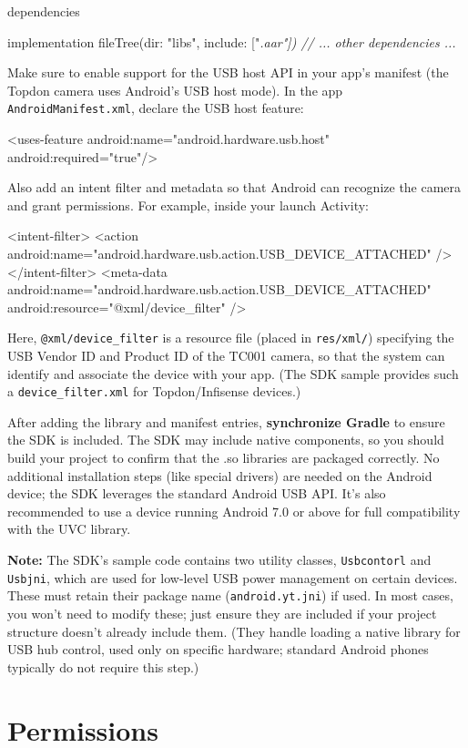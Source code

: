     dependencies {
        implementation fileTree(dir: "libs", include: ["\textit{.aar"])
        // ... other dependencies ...
    }

Make sure to enable support for the USB host API in your app's manifest
(the Topdon camera uses Android's USB host mode). In the app
\texttt{AndroidManifest.xml}, declare the USB host feature:

    <uses-feature android:name="android.hardware.usb.host" android:required="true"/>

Also add an intent filter and metadata so that Android can recognize the
camera and grant permissions. For example, inside your launch Activity:

    <intent-filter>
        <action android:name="android.hardware.usb.action.USB_DEVICE_ATTACHED" />
    </intent-filter>
    <meta-data 
        android:name="android.hardware.usb.action.USB_DEVICE_ATTACHED"
        android:resource="@xml/device_filter" />

Here, \texttt{@xml/device_filter} is a resource file (placed in \texttt{res/xml/})
specifying the USB Vendor ID and Product ID of the TC001 camera, so that
the system can identify and associate the device with your app. (The SDK
sample provides such a \texttt{device_filter.xml} for Topdon/Infisense
devices.)

After adding the library and manifest entries, \textbf{synchronize Gradle} to
ensure the SDK is included. The SDK may include native components, so
you should build your project to confirm that the .so libraries are
packaged correctly. No additional installation steps (like special
drivers) are needed on the Android device; the SDK leverages the
standard Android USB API. It's also recommended to use a device running
Android 7.0 or above for full compatibility with the UVC library.

\textbf{Note:} The SDK's sample code contains two utility classes,
\texttt{Usbcontorl} and \texttt{Usbjni}, which are used for low-level USB power
management on certain devices. These must retain their package name
(\texttt{android.yt.jni}) if
used\cite{ref12}.
In most cases, you won't need to modify these; just ensure they are
included if your project structure doesn't already include them. (They
handle loading a native library for USB hub control, used only on
specific hardware; standard Android phones typically do not require this
step.)

\section{Permissions}

}
